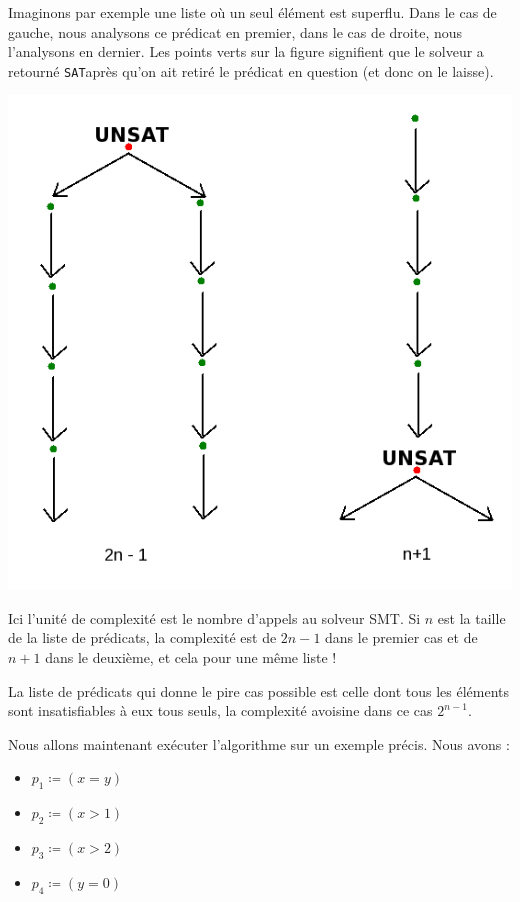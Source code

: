 \documentclass[french]{article}
\newcommand\SAT{\texttt{SAT}}
\begin{document}
  Imaginons par exemple une liste où un seul élément est superflu. Dans le cas de gauche, nous analysons ce prédicat en premier, dans le cas de droite, nous l'analysons en dernier. Les points verts sur la figure signifient que le solveur a retourné \SAT après qu'on ait retiré le prédicat en question (et donc on le laisse).

  \begin{center}
    \includegraphics[scale=0.7]{./pictures/alg3_complexity.png}
  \end{center}

  Ici l'unité de complexité est le nombre d'appels au solveur SMT. Si $n$ est la taille de la liste de prédicats, la complexité est de $2n-1$ dans le premier cas et de $n+1$ dans le deuxième, et cela pour une même liste !

  La liste de prédicats qui donne le pire cas possible est celle dont tous les éléments sont insatisfiables à eux tous seuls, la complexité avoisine dans ce cas $2^{n-1}$.

  \bigbreak

  Nous allons maintenant exécuter l'algorithme sur un exemple précis. Nous avons :

  \begin{itemize}
    \item $p_1 \coloneqq (x = y)$
    \item $p_2 \coloneqq (x > 1)$
    \item $p_3 \coloneqq (x > 2)$
    \item $p_4 \coloneqq (y = 0)$
  \end{itemize}
\end{document}
